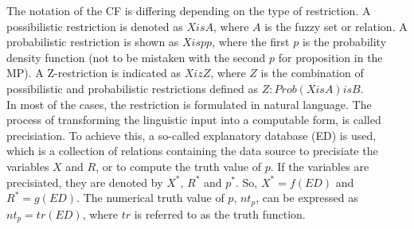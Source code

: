 \documentclass[conference]{IEEEtran}
\begin{document}
The notation of the CF is differing depending on the type of restriction. A possibilistic restriction is denoted as \begin{math} X is A \end{math}, where \begin{math} A \end{math} is the fuzzy set or relation. A probabilistic restriction is shown as \begin{math} X isp p \end{math}, where the first \begin{math} p \end{math} is the probability density function (not to be mistaken with the second \begin{math} p \end{math} for proposition in the MP). A Z-restriction is indicated as \begin{math} X iz Z \end{math}, where \begin{math} Z \end{math} is the combination of possibilistic and probabilistic restrictions defined as \begin{math} Z: Prob(X is A) is B \end{math}.\\
In most of the cases, the restriction is formulated in natural language. The process of transforming the linguistic input into a computable form, is called precisiation. To achieve this, a so-called explanatory database (ED) is used, which is a collection of relations containing the data source to precisiate the variables \begin{math} X \end{math} and \begin{math} R \end{math}, or to compute the truth value of \begin{math} p \end{math}. If the variables are precisiated, they are denoted by \begin{math} X^{*} \end{math}, \begin{math} R^{*} \end{math} and \begin{math}p^{*} \end{math}. So, \begin{math} X^{*}=f(ED) \end{math} and \begin{math} R^{*}=g(ED) \end{math}. The numerical truth value of \begin{math} p \end{math}, \begin{math}nt_{p} \end{math}, can be expressed as \begin{math} nt_{p}=tr(ED) \end{math}, where \begin{math} tr \end{math} is referred to as the truth function.
\end{document}
